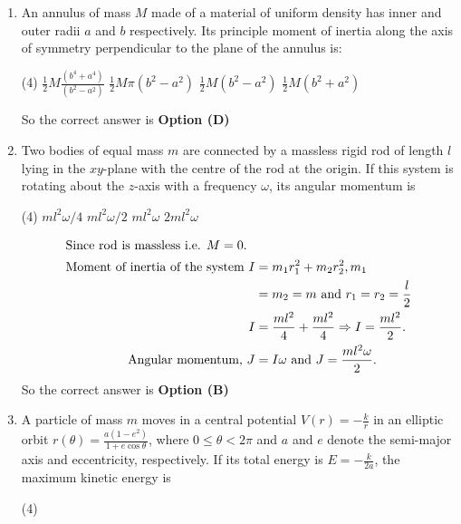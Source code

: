\begin{enumerate}
\begin{answer}
\end{answer}
	\item An annulus of mass $M$ made of a material of uniform density has inner and outer radii $a$ and $b$ respectively. Its principle moment of inertia along the axis of symmetry perpendicular to the plane of the annulus is:
{	}
\begin{tasks}(4)
\task[\textbf{A.}] $\frac{1}{2} M \frac{\left(b^{4}+a^{4}\right)}{\left(b^{2}-a^{2}\right)}$
\task[\textbf{B.}] $\frac{1}{2} M \pi\left(b^{2}-a^{2}\right)$
\task[\textbf{C.}]  $\frac{1}{2} M\left(b^{2}-a^{2}\right)$
\task[\textbf{D.}] $\frac{1}{2} M\left(b^{2}+a^{2}\right)$
\end{tasks}
\begin{answer}
So the correct answer is \textbf{Option (D)}
\end{answer}
	\item Two bodies of equal mass $m$ are connected by a massless rigid rod of length $l$ lying in the $x y$-plane with the centre of the rod at the origin. If this system is rotating about the $z$-axis with a frequency $\omega$, its angular momentum is
{	}
\begin{tasks}(4)
\task[\textbf{A.}] $m l^{2} \omega / 4$
\task[\textbf{B.}] $m l^{2} \omega / 2$
\task[\textbf{C.}] $m l^{2} \omega$
\task[\textbf{D.}]  $2 m l^{2} \omega$
\end{tasks}
\begin{answer}
\begin{align*}
\intertext{Since rod is massless i.e. $M=0$.}
\text{Moment of inertia of the system }I&=m_{1} r_{1}^{2}+m_{2} r_{2}^{2}, m_{1}\\&=m_{2}=m\text{ and }r_{1}=r_{2}=\frac{l}{2}\\
I&=\frac{m l^{2}}{4}+\frac{m l^{2}}{4} \Rightarrow I=\frac{m l^{2}}{2}.\\\text{ Angular momentum, }J&=I \omega\text{ and }J=\frac{m l^{2} \omega}{2}.
\end{align*}
So the correct answer is \textbf{Option (B)}
\end{answer}
	\item A particle of mass $m$ moves in a central potential $V(r)=-\frac{k}{r}$ in an elliptic orbit $r(\theta)=\frac{a\left(1-e^{2}\right)}{1+e \cos \theta}$, where $0 \leq \theta<2 \pi$ and $a$ and $e$ denote the semi-major axis and eccentricity, respectively. If its total energy is $E=-\frac{k}{2 a}$, the maximum kinetic energy is
{	}
\begin{tasks}(4)

\end{tasks}
\end{enumerate}
